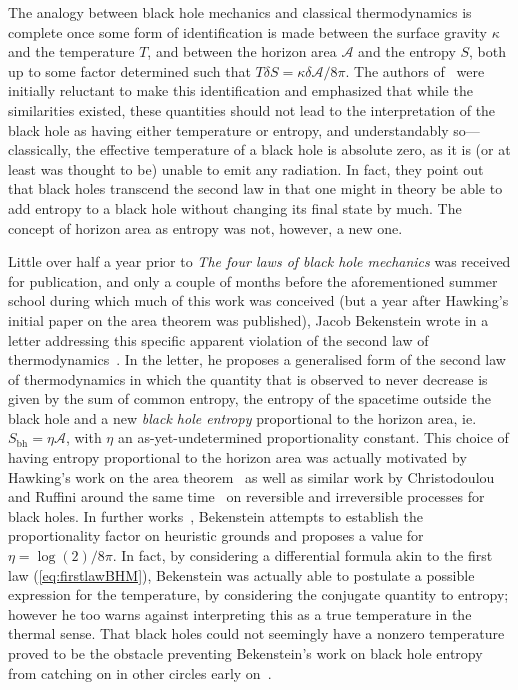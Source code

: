 \documentclass[
twoside,
openright,
frontopenright,
]{dmathesis}
\begin{document}
The analogy between black hole mechanics and classical thermodynamics is
complete once some form of identification is made between the surface gravity
$\kappa$ and the temperature $T$, and between the horizon area $\mathcal{A}$ and
the entropy $S$, both up to some factor determined such that
$T\delta S = \kappa \delta \mathcal{A} / 8\pi$. The authors
of~\cite{Bardeen:1973gs} were initially reluctant to make this identification
and emphasized that while the similarities existed, these quantities should not
lead to the interpretation of the black hole as having either temperature or
entropy, and understandably so---classically, the effective temperature of a
black hole is absolute zero, as it is (or at least was thought to be) unable to
emit any radiation. In fact, they point out that black holes transcend the
second law in that one might in theory be able to add entropy to a black hole
without changing its final state by much. The concept of horizon area as entropy
was not, however, a new one.

Little over half a year prior to \emph{The four laws of black hole mechanics}
was received for publication, and only a couple of months before the
aforementioned summer school during which much of this work was conceived (but a
year after Hawking's initial paper on the area theorem was published), Jacob
Bekenstein wrote in a letter addressing this specific apparent violation of the
second law of thermodynamics~\cite{Bekenstein:1972tm}. In the letter, he
proposes a generalised form of the second law of thermodynamics in which the
quantity that is observed to never decrease is given by the sum of common
entropy, the entropy of the spacetime outside the black hole and a new
\emph{black hole entropy} proportional to the horizon area, ie.
$S_{\mathrm{bh}}=\eta \mathcal{A}$, with $\eta$ an as-yet-undetermined
proportionality constant. This choice of having entropy proportional to the
horizon area was actually motivated by Hawking's work on the area
theorem~\cite{Hawking:1971tu} as well as similar work by Christodoulou and
Ruffini around the same time~\cite{Christodoulou:1970wf,Christodoulou:1972kt} on
reversible and irreversible processes for black holes. In further
works~\cite{Bekenstein:1973ur,Bekenstein:1974ax}, Bekenstein attempts to
establish the proportionality factor on heuristic grounds and proposes a value
for $\eta=\log(2)/8\pi$. In fact, by considering a differential formula akin to
the first law (\cref{eq:firstlawBHM}), Bekenstein was actually able to postulate
a possible expression for the temperature, by considering the conjugate quantity
to entropy; however he too warns against interpreting this as a true temperature
in the thermal sense. That black holes could not seemingly have a nonzero
temperature proved to be the obstacle preventing Bekenstein's work on black hole
entropy from catching on in other circles early on~\cite{10.2307/24953849}.
\end{document}
